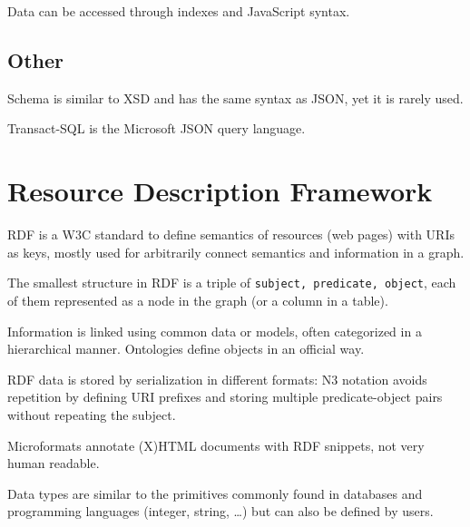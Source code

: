 Data can be accessed through indexes and JavaScript syntax.

\subsection{Other}
Schema is similar to XSD and has the same syntax as JSON, yet it is rarely used.

Transact-SQL is the Microsoft JSON query language.

\section{Resource Description Framework}
RDF is a W3C standard to define semantics of resources (web pages) with URIs as keys, mostly used for arbitrarily connect semantics and information in a graph. 

The smallest structure in RDF is a triple of \texttt{subject, predicate, object}, each of them represented as a node in the graph (or a column in a table). 

Information is linked using common data or models, often categorized in a hierarchical manner. Ontologies define objects in an official way.

RDF data is stored by serialization in different formats: N3 notation avoids repetition by defining URI prefixes and storing multiple predicate-object pairs without repeating the subject.

Microformats annotate (X)HTML documents with RDF snippets, not very human readable. 

Data types are similar to the primitives commonly found in databases and programming languages (integer, string, \dots) but can also be defined by users. 






